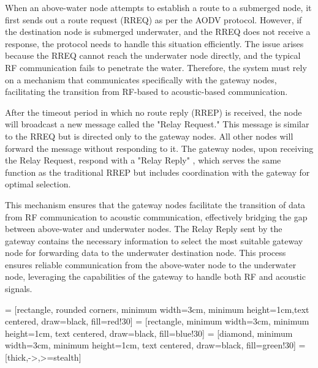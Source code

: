 \documentclass[]{nsm-thesis}
\begin{document}
When an above-water node attempts to establish a route to a submerged node, it first sends out a route request (RREQ) as per the AODV protocol. However, if the destination node is submerged underwater, and the RREQ does not receive a response, the protocol needs to handle this situation efficiently. The issue arises because the RREQ cannot reach the underwater node directly, and the typical RF communication fails to penetrate the water. Therefore, the system must rely on a mechanism that communicates specifically with the gateway nodes, facilitating the transition from RF-based to acoustic-based communication.

After the timeout period in which no route reply (RREP) is received, the node will broadcast a new message called the "Relay Request." This message is similar to the RREQ but is directed only to the gateway nodes. All other nodes will forward the message without responding to it. The gateway nodes, upon receiving the Relay Request, respond with a "Relay Reply" , which serves the same function as the traditional RREP but includes coordination with the gateway for optimal selection.

This mechanism ensures that the gateway nodes facilitate the transition of data from RF communication to acoustic communication, effectively bridging the gap between above-water and underwater nodes. The Relay Reply sent by the gateway contains the necessary information to select the most suitable gateway node for forwarding data to the underwater destination node. This process ensures reliable communication from the above-water node to the underwater node, leveraging the capabilities of the gateway to handle both RF and acoustic signals.

 = [rectangle, rounded corners, minimum width=3cm, minimum height=1cm,text centered, draw=black, fill=red!30]
 = [rectangle, minimum width=3cm, minimum height=1cm, text centered, draw=black, fill=blue!30]
 = [diamond, minimum width=3cm, minimum height=1cm, text centered, draw=black, fill=green!30]
 = [thick,->,>=stealth]
\end{document}
